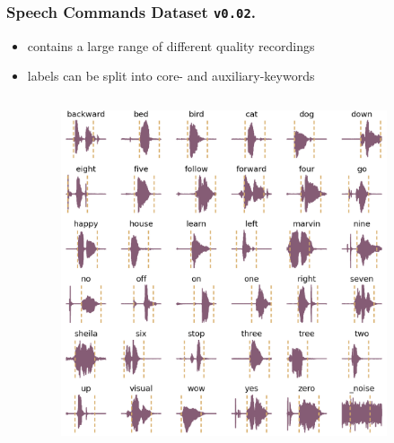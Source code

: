 \begin{frame}
  \frametitle{Speech Commands Dataset \texttt{v0.02}.}
  \begin{itemize}
    \item contains a large range of different quality recordings
    \item labels can be split into core- and auxiliary-keywords
  \end{itemize}
  \vspace{-0.5cm}
  \begin{columns}
    \begin{column}{0.55\textwidth}
    \centering
    
    \end{column}
    \begin{column}{0.45\textwidth}
      \centering
      \begin{figure} \includegraphics[width=0.9\textwidth]{../5_exp/figs/exp_dataset_speech_cmd_wav_grid.png} \end{figure}
    \end{column}
  \end{columns}
\end{frame}

